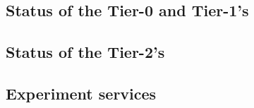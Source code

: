 \subsection {Status of the Tier-0 and Tier-1's}
\label{ssec-t1trans}


\subsection {Status of the Tier-2's}
\label{ssec-t2trans}


\subsection {Experiment services}
\label{ssec-exps}


%

